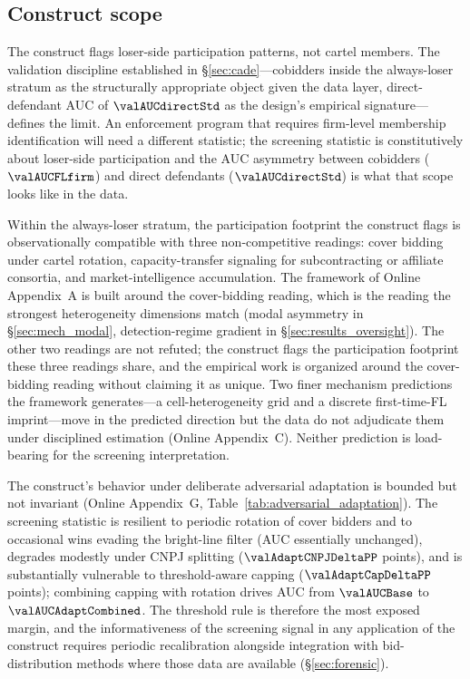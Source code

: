 \subsection{Construct scope}
\label{sec:lim_construct}

The construct flags loser-side participation patterns, not
cartel members. The validation discipline established in
§\ref{sec:cade}---cobidders inside the always-loser stratum as
the structurally appropriate object given the data layer,
direct-defendant AUC of $\valAUCdirectStd$ as the design's
empirical signature---defines the limit. An enforcement program
that requires firm-level membership identification will need a
different statistic; the screening statistic is constitutively
about loser-side participation and the AUC asymmetry between
cobidders ($\valAUCFLfirm$) and direct defendants
($\valAUCdirectStd$) is what that scope looks like in the data.

Within the always-loser stratum, the participation footprint
the construct flags is observationally compatible with three
non-competitive readings: cover bidding under cartel rotation,
capacity-transfer signaling for subcontracting or affiliate
consortia, and market-intelligence accumulation. The framework
of Online Appendix~A is built around the cover-bidding reading,
which is the reading the strongest heterogeneity dimensions
match (modal asymmetry in §\ref{sec:mech_modal}, detection-regime
gradient in §\ref{sec:results_oversight}). The other two
readings are not refuted; the construct flags the participation
footprint these three readings share, and the empirical work is
organized around the cover-bidding reading without claiming it
as unique. Two finer mechanism predictions the framework
generates---a cell-heterogeneity grid and a discrete
first-time-FL imprint---move in the predicted direction but the
data do not adjudicate them under disciplined estimation
(Online Appendix~C). Neither prediction is load-bearing for the
screening interpretation.

The construct's behavior under deliberate adversarial adaptation
is bounded but not invariant
(Online Appendix~G,
Table~\ref{tab:adversarial_adaptation}). The screening
statistic is resilient to periodic rotation of cover bidders
and to occasional wins evading the bright-line filter (AUC
essentially unchanged), degrades modestly under CNPJ splitting
($\valAdaptCNPJDeltaPP$ points), and is substantially vulnerable
to threshold-aware capping ($\valAdaptCapDeltaPP$ points);
combining capping with rotation drives AUC from $\valAUCBase$
to $\valAUCAdaptCombined$. The threshold rule is therefore the
most exposed margin, and the informativeness of the screening
signal in any application of the construct requires periodic
recalibration alongside integration with bid-distribution
methods where those data are available
(§\ref{sec:forensic}).

